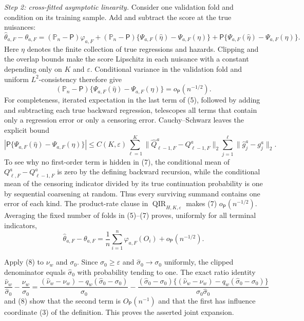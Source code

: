 \emph{Step 2: cross-fitted asymptotic linearity.}
Consider one validation fold and condition on its training sample.  Add and subtract the score at the true nuisances:
\[
 \widehat\theta_{a,F}-\theta_{a,F}
 =(\mathbb P_n-\mathsf P)\varphi_{a,F}
 +(\mathbb P_n-\mathsf P)\{\Psi_{a,F}(\widehat\eta)-\Psi_{a,F}(\eta)\}
 +\mathsf P\{\Psi_{a,F}(\widehat\eta)-\Psi_{a,F}(\eta)\}. \tag{5}
\]
Here \(\eta\) denotes the finite collection of true regressions and hazards.  Clipping and the overlap bounds make the score Lipschitz in each nuisance with a constant depending only on \(K\) and \(\varepsilon\).  Conditional variance in the validation fold and uniform \(L^2\)-consistency therefore give
\[
 (\mathbb P_n-\mathsf P)\{\Psi_{a,F}(\widehat\eta)-\Psi_{a,F}(\eta)\}
 =o_{\mathsf P}(n^{-1/2}).                                \tag{6}
\]
For completeness, iterated expectation in the last term of (5), followed by adding and subtracting each true backward regression, telescopes all terms that contain only a regression error or only a censoring error.  Cauchy--Schwarz leaves the explicit bound
\[
 \left|\mathsf P\{\Psi_{a,F}(\widehat\eta)-\Psi_{a,F}(\eta)\}\right|
 \le C(K,\varepsilon)
 \sum_{\ell=1}^{K}
 \lVert\widehat Q_{\ell-1,F}^a-Q_{\ell-1,F}^a\rVert_2
 \sum_{j=1}^{\ell}\lVert\widehat g_j^a-g_j^a\rVert_2.    \tag{7}
\]
To see why no first-order term is hidden in (7), the conditional mean of
\(Q_{\ell,F}^a-Q_{\ell-1,F}^a\) is zero by the defining backward recursion, while the conditional mean of the censoring indicator divided by its true continuation probability is one by sequential coarsening at random.  Thus every surviving summand contains one error of each kind.  The product-rate clause in \(\operatorname{QIR}_{H,K,\varepsilon}\) makes (7) \(o_{\mathsf P}(n^{-1/2})\).  Averaging the fixed number of folds in (5)--(7) proves, uniformly for all terminal indicators,
\[
 \widehat\theta_{a,F}-\theta_{a,F}
 =\frac1n\sum_{i=1}^n\varphi_{a,F}(O_i)+o_{\mathsf P}(n^{-1/2}). \tag{8}
\]

Apply (8) to \(\nu_w\) and \(\sigma_0\).  Since \(\sigma_0\ge\varepsilon\) and \(\widehat\sigma_0\to\sigma_0\) uniformly, the clipped denominator equals \(\widehat\sigma_0\) with probability tending to one.  The exact ratio identity
\[
 \frac{\widehat\nu_w}{\widehat\sigma_0}-\frac{\nu_w}{\sigma_0}
 =\frac{(\widehat\nu_w-\nu_w)-q_w(\widehat\sigma_0-\sigma_0)}{\sigma_0}
 -\frac{(\widehat\sigma_0-\sigma_0)
 \{(\widehat\nu_w-\nu_w)-q_w(\widehat\sigma_0-\sigma_0)\}}
 {\sigma_0\widehat\sigma_0}                              \tag{9}
\]
and (8) show that the second term is \(O_{\mathsf P}(n^{-1})\) and that the first has influence coordinate (3) of the definition.  This proves the asserted joint expansion.

